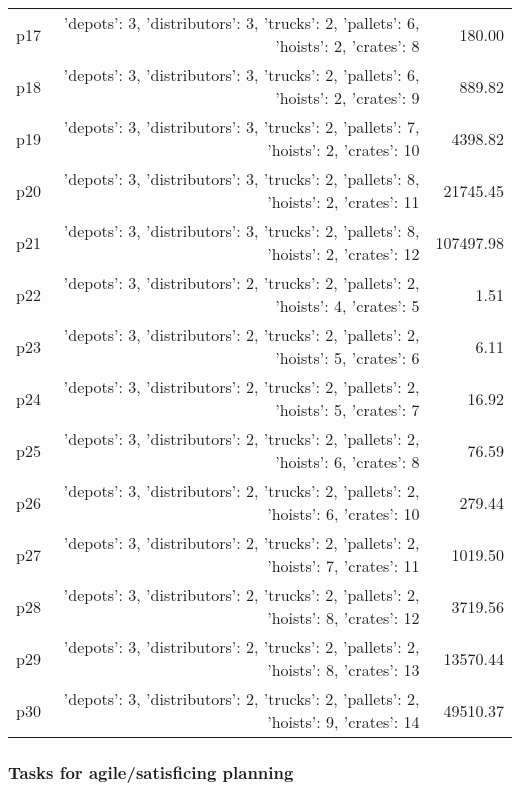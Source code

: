 \documentclass{article}
\begin{document}
\begin{center}
\begin{tabular}{@{}l|r|r@{}}
  p17&{'depots': 3, 'distributors': 3, 'trucks': 2, 'pallets': 6, 'hoists': 2, 'crates': 8}&180.00\\
  p18&{'depots': 3, 'distributors': 3, 'trucks': 2, 'pallets': 6, 'hoists': 2, 'crates': 9}&889.82\\
  p19&{'depots': 3, 'distributors': 3, 'trucks': 2, 'pallets': 7, 'hoists': 2, 'crates': 10}&4398.82\\
  p20&{'depots': 3, 'distributors': 3, 'trucks': 2, 'pallets': 8, 'hoists': 2, 'crates': 11}&21745.45\\
  p21&{'depots': 3, 'distributors': 3, 'trucks': 2, 'pallets': 8, 'hoists': 2, 'crates': 12}&107497.98\\
  p22&{'depots': 3, 'distributors': 2, 'trucks': 2, 'pallets': 2, 'hoists': 4, 'crates': 5}&1.51\\
  p23&{'depots': 3, 'distributors': 2, 'trucks': 2, 'pallets': 2, 'hoists': 5, 'crates': 6}&6.11\\
  p24&{'depots': 3, 'distributors': 2, 'trucks': 2, 'pallets': 2, 'hoists': 5, 'crates': 7}&16.92\\
  p25&{'depots': 3, 'distributors': 2, 'trucks': 2, 'pallets': 2, 'hoists': 6, 'crates': 8}&76.59\\
  p26&{'depots': 3, 'distributors': 2, 'trucks': 2, 'pallets': 2, 'hoists': 6, 'crates': 10}&279.44\\
  p27&{'depots': 3, 'distributors': 2, 'trucks': 2, 'pallets': 2, 'hoists': 7, 'crates': 11}&1019.50\\
  p28&{'depots': 3, 'distributors': 2, 'trucks': 2, 'pallets': 2, 'hoists': 8, 'crates': 12}&3719.56\\
  p29&{'depots': 3, 'distributors': 2, 'trucks': 2, 'pallets': 2, 'hoists': 8, 'crates': 13}&13570.44\\
  p30&{'depots': 3, 'distributors': 2, 'trucks': 2, 'pallets': 2, 'hoists': 9, 'crates': 14}&49510.37
                            \end{tabular}
                            \end{center}
                    

                                \subsubsection*{Tasks for agile/satisficing planning}
                                
\end{document}
